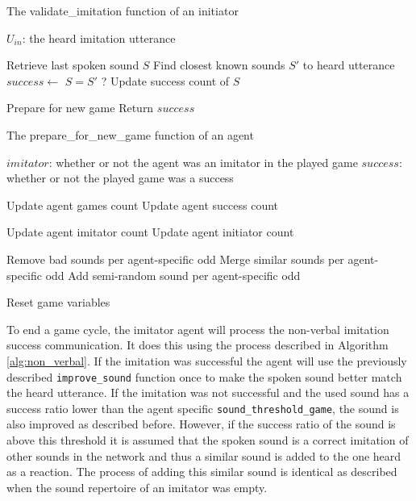 
\begin{algorithm}[hbt!]
\caption{The validate\_imitation function of an initiator}\label{alg:validate_imitation}
\begin{algorithmic}
\Require $U_{in}$: the heard imitation utterance

\State Retrieve last spoken sound $S$
\State Find closest known sounds $S'$ to heard utterance
\State $success \gets$ $S = S'$ ?
    \State Update success count of $S$
\EndIf

\State Prepare for new game
\State Return $success$
\end{algorithmic}
\end{algorithm}


\begin{algorithm}[hbt!]
\caption{The prepare\_for\_new\_game function of an agent}\label{alg:prepare_new}
\begin{algorithmic}
\Require $imitator$: whether or not the agent was an imitator in the played game
\Require $success$: whether or not the played game was a success

\State Update agent games count
    \State Update agent success count
\EndIf

    \State Update agent imitator count
\Else
    \State Update agent initiator count
\EndIf

\State Remove bad sounds per agent-specific odd
\State Merge similar sounds per agent-specific odd
\State Add semi-random sound per agent-specific odd

\State Reset game variables

\end{algorithmic}
\end{algorithm}

\newpage
To end a game cycle, the imitator agent will process the non-verbal imitation success communication.
It does this using the process described in Algorithm \ref{alg:non_verbal}.
If the imitation was successful the agent will use the previously described \texttt{improve\_sound} function once to make the spoken sound better match the heard utterance.
If the imitation was not successful and the used sound has a success ratio lower than the agent specific \texttt{sound\_threshold\_game}, the sound is also improved as described before.
However, if the success ratio of the sound is above this threshold it is assumed that the spoken sound is a correct imitation of other sounds in the network and thus a similar sound is added to the one heard as a reaction.
The process of adding this similar sound is identical as described when the sound repertoire of an imitator was empty.


